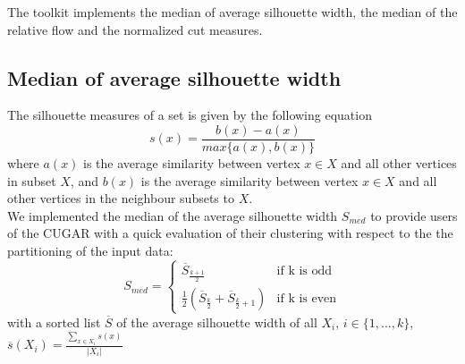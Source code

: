 \documentclass[a4paper, 11pt]{article}
\begin{document}
	The toolkit implements the median of average silhouette width, the median of the relative flow and the normalized cut measures.

	\subsection{Median of average silhouette width}
		The silhouette measures of a set is given by the following equation\cite{1}
		\[
		s(x) = \frac{b(x) - a(x)}{max\{a(x),b(x)\}}
		\]
		where $a(x)$ is the average similarity between vertex $x\in X$
		and all other vertices in subset $X$,
		and $b(x)$ is the average similarity between vertex $x\in X$ and
		all other vertices in the neighbour subsets to $X$.\\

		We implemented the median of the average silhouette width $S_{med}$ to provide users of the CUGAR with a quick evaluation of their clustering with respect to the the partitioning of the input data:
		\[
		S_{med}=	
		\begin{cases}
			\text{$\overline S_{\frac{k+1}{2}}$} &\text{if k is odd}\\
			\text{$\frac{1}{2}(\overline S_{\frac{k}{2}} + \overline S_{\frac{k}{2}+1})$} &\text{if k is even}					
		\end{cases}
		\]
		with a sorted list $\overline S$ of the average silhouette width of all $X_i$, $i\in\{1,...,k\}$, $\overline s(X_i) =\frac{ \sum_{x \in X_i} s(x)}{|X_i|} $
\end{document}
